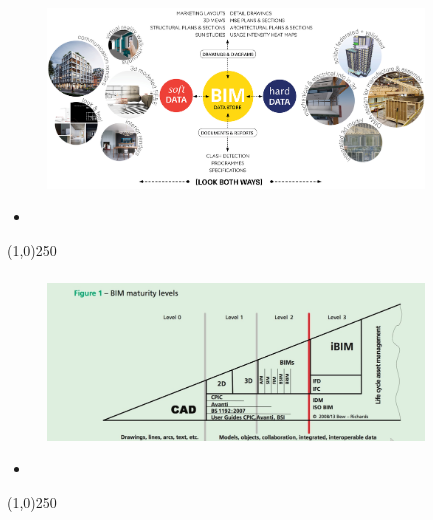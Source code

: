 \begin{frame}
\frametitle{}
\begin{figure}
	\centering
	\includegraphics[width=10cm]{./images/BIM-Data-Store-4.jpg}
	\caption[]{}
	\label{fig:}
\end{figure}
\begin{itemize}
	\item 
\end{itemize}
\end{frame}
\begin{center}\line(1,0){250}\end{center}




\begin{frame}
\frametitle{}
\begin{figure}
	\centering
	\includegraphics[width=10cm]{./images/bimmaturity Levels.jpg}
	\caption[]{}
	\label{fig:}
\end{figure}
\begin{itemize}
	\item 
\end{itemize}
\end{frame}
\begin{center}\line(1,0){250}\end{center}



